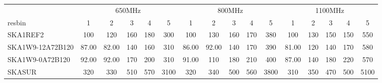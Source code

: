 \begin{table}[!htp]
{{\begin{tabular}{|lccccc||ccccc||ccccc|}
 \tabularnewline \cline{2-16} \multicolumn{1}{c}{ } & \multicolumn{5}{|c}{650MHz}  & \multicolumn{5}{c}{800MHz}  & \multicolumn{5}{c|}{1100MHz} \tabularnewline \cline{1-16} 
 resbin  &1 & 2 & 3 & 4 & 5 & 1 & 2 & 3 & 4 & 5 & 1 & 2 & 3 & 4 & 5 \tabularnewline \hline
SKA1REF2 & 100 \cellcolor{blue!20.34} & 120 \cellcolor{red!24.44} & 160 \cellcolor{green!20.27} & 180 \cellcolor{orange!20.05} & 300 \cellcolor{purple!18.00} & 100 \cellcolor{blue!20.51} & 130 \cellcolor{red!24.44} & 160 \cellcolor{green!20.33} & 170 \cellcolor{orange!18.00} & 380 \cellcolor{purple!18.00} & 100 \cellcolor{blue!21.48} & 130 \cellcolor{red!19.83} & 150 \cellcolor{green!19.27} & 150 \cellcolor{orange!18.00} & 550 \cellcolor{purple!18.00}\\ \hline 
SKA1W9-12A72B120 & 87.00 \cellcolor{blue!18.00} & 82.00 \cellcolor{red!18.00} & 140 \cellcolor{green!18.00} & 160 \cellcolor{orange!18.00} & 310 \cellcolor{purple!18.15} & 86.00 \cellcolor{blue!18.00} & 92.00 \cellcolor{red!18.00} & 140 \cellcolor{green!18.00} & 170 \cellcolor{orange!18.00} & 390 \cellcolor{purple!18.12} & 81.00 \cellcolor{blue!18.00} & 120 \cellcolor{red!18.00} & 140 \cellcolor{green!18.00} & 170 \cellcolor{orange!20.40} & 580 \cellcolor{purple!18.28}\\ \hline 
SKA1W9-0A72B120 & 92.00 \cellcolor{blue!18.90} & 92.00 \cellcolor{red!19.69} & 170 \cellcolor{green!21.41} & 200 \cellcolor{orange!22.10} & 310 \cellcolor{purple!18.15} & 91.00 \cellcolor{blue!18.90} & 110 \cellcolor{red!21.05} & 180 \cellcolor{green!22.67} & 210 \cellcolor{orange!22.31} & 400 \cellcolor{purple!18.25} & 87.00 \cellcolor{blue!19.10} & 140 \cellcolor{red!21.65} & 180 \cellcolor{green!23.09} & 220 \cellcolor{orange!26.40} & 570 \cellcolor{purple!18.18}\\ \hline 
SKASUR & 320 \cellcolor{blue!60.00} & 330 \cellcolor{red!60.00} & 510 \cellcolor{green!60.00} & 570 \cellcolor{orange!60.00} & 3100 \cellcolor{purple!60.00} & 320 \cellcolor{blue!60.00} & 340 \cellcolor{red!60.00} & 500 \cellcolor{green!60.00} & 560 \cellcolor{orange!60.00} & 3800 \cellcolor{purple!60.00} & 310 \cellcolor{blue!60.00} & 350 \cellcolor{red!60.00} & 470 \cellcolor{green!60.00} & 500 \cellcolor{orange!60.00} & 5100 \cellcolor{purple!60.00}\tabularnewline \hline 
\end{tabular}}\hfil 
{}}
\end{table}
